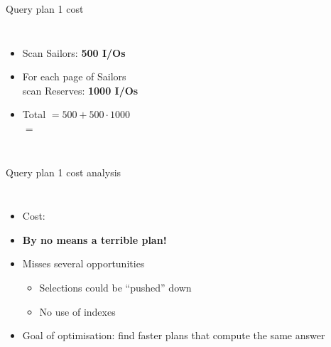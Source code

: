 \begin{frame}{Query plan 1 cost }
  \begin{columns}[c]
      \begin{itemize}
        : $M + M\cdot N$, \\ here: $[S] + [S]\cdot[R]$
        \item Scan Sailors: \textbf{500 I/Os}
        \item For each page of Sailors \\ scan Reserves: \textbf{1000 I/Os}
        \item Total $= 500 + 500 \cdot 1000$\\ \phantom{Total} $=$ 
      \end{itemize}
      \planbox{56mm}{\PlanOne}
  \end{columns}
\end{frame}

\begin{frame}{Query plan 1 cost analysis }
  \begin{columns}[c]
      \begin{itemize}
        \item Cost: 
        \item \textbf{By no means a terrible plan!}
        \item Misses several opportunities
        \begin{itemize}
          \item Selections could be ``pushed'' down
          \item No use of indexes
        \end{itemize}
        \item Goal of optimisation: find \alert{faster plans} that compute the \alert{same answer}
      \end{itemize}
      \planbox{56mm}{\PlanOne}
  \end{columns}
\end{frame}


